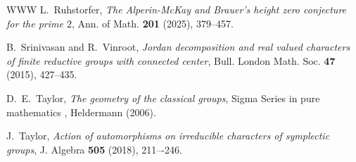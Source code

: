 \documentclass{amsart}
\theoremstyle{plain}\newtheorem{Theorem}{Theorem}[section]
\theoremstyle{plain}\newtheorem{Conjecture}[Theorem]{Conjecture}
\theoremstyle{plain}\newtheorem{Corollary}[Theorem]{Corollary}
\theoremstyle{plain}\newtheorem{Lemma}[Theorem]{Lemma}
\theoremstyle{plain}\newtheorem{Proposition}[Theorem]{Proposition}
\theoremstyle{definition}\newtheorem{Definition}[Theorem]{Definition}
\theoremstyle{definition}\newtheorem{Example}[Theorem]{Example}
\theoremstyle{definition}\newtheorem{Examples}[Theorem]{Examples}
\theoremstyle{definition}\newtheorem{Exercise}[Theorem]{Exercise}
\theoremstyle{definition}\newtheorem{Notation}[Theorem]{Notation}
\theoremstyle{definition}\newtheorem{Remark}[Theorem]{Remark}
\theoremstyle{definition}\newtheorem{Remarks}[Theorem]{Remarks}
\numberwithin{equation}{section}
\begin{document}
\begin{thebibliography}{WWW}
L.~Ruhstorfer, \emph{The Alperin-McKay and Brauer's height zero conjecture for the prime $2$}, Ann. of Math. {\bf 201} (2025), 379--457.

 B.~Srinivasan and  R.~Vinroot, \emph{Jordan decomposition and real valued characters of finite reductive groups with connected center}, Bull. London  Math. Soc. \textbf{47} (2015), 427--435.

 D.~E.~Taylor, {\em   The geometry of  the classical groups},  Sigma Series in pure mathematics , Heldermann (2006).

 J.~Taylor, \emph{Action of automorphisms on irreducible characters of symplectic groups}, J. Algebra \textbf{505} (2018), 211–-246.

 
\end{thebibliography}
\end{document}

